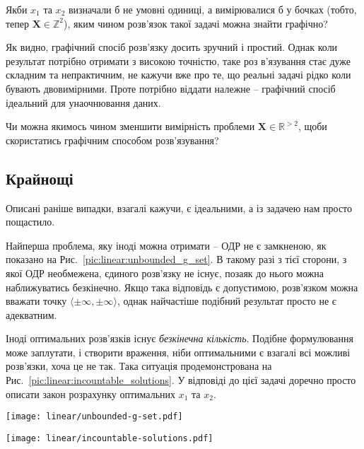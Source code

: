 \documentclass[\main/book.tex]{subfiles}
\begin{document}
\begin{question}
 Якби $x_1$ та $x_2$ визначали б не умовні одиниці, а вимірювалися б у бочках (тобто, тепер $\mathbf{X} \in \mathbb{Z}^2$), яким чином розв'язок такої задачі можна знайти графічно?
\end{question}

Як видно, графічний спосіб розв'язку досить зручний і простий. Однак коли результат потрібно отримати з високою точністю, таке роз
\-в'я\-зу\-ван\-ня стає дуже складним та непрактичним, не кажучи вже про те, що реальні задачі рідко коли бувають двовимірними. Проте потрібно віддати належне -- графічний спосіб ідеальний для унаочнювання даних.

\begin{question}
 Чи можна якимось чином зменшити вимірність проблеми ${\mathbf{X} \in \mathbb{R}^{> 2}}$, щоби скористатись графічним способом розв'язування?
\end{question}


\subsection{Крайнощі}

Описані раніше випадки, взагалі кажучи, є ідеальними, а із задачею нам просто пощастило.

Найперша проблема, яку іноді можна отримати -- ОДР не є замкненою, як показано на Рис.~\ref{pic:linear:unbounded_g_set}. В такому разі з тієї сторони, з якої ОДР необмежена, єдиного розв'язку не існує, позаяк до нього можна наближуватись безкінечно. Якщо така відповідь є допустимою, розв'язком можна вважати точку ${\langle \pm \infty, \pm \infty \rangle}$, однак найчастіше подібний результат просто не є адекватним.

Іноді оптимальних розв'язків існує \textit{безкінечна кількість}. Подібне формулювання може заплутати, і створити враження, ніби оптимальними є взагалі всі можливі розв'язки, хоча це не так. Така ситуація продемонстрована на Рис.~\ref{pic:linear:incountable_solutions}. У відповіді до цієї задачі доречно просто описати закон розрахунку оптимальних $x_1$ та $x_2$.

\begin{figure*}
\centering
\begin{minipage}[t]{.47\textwidth}
 \texttt{[image: linear/unbounded-g-set.pdf]}
 \caption{ОДР складається з однієї нерівності, тому є необмеженою зі сторони від'ємних $x_1$ та $x_2$. Тут можна розв'язати задачу на максимізацію, однак розв'язком мінімізації буде точка $\langle -\infty, -\infty \rangle$.}
 \label{pic:linear:unbounded_g_set}
\end{minipage}\qquad
\begin{minipage}[t]{.47\textwidth}
 \texttt{[image: linear/incountable-solutions.pdf]}
 \caption{Іноді неможливо визначити точку, що лежить найдалі за напрямком градієнта, оскільки всі точки на деякій лінії мають однакову оптимальність. В такому разі вони всі є оптимальними, і не існує єдиного $\mathbf{X}$.}
 \label{pic:linear:incountable_solutions}
\end{minipage}
\end{figure*}
\end{document}
